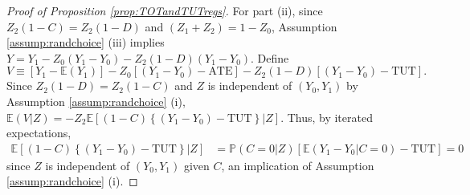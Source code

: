\begin{appendix}
\begin{proof}[Proof of Proposition \ref{prop:TOTandTUTregs}]
For part (ii), since $Z_2(1 - C)= Z_2(1 - D)$ and $(Z_1 + Z_2) = 1 - Z_0$,  Assumption \ref{assump:randchoice} (iii) implies $Y= Y_1 - Z_0 (Y_1 - Y_0) - Z_2(1 - D) (Y_1 - Y_0)$.
Define 
\[
V \equiv [Y_1 - \mathbb{E}(Y_1)] - Z_0[(Y_1 - Y_0) - \text{ATE}] - Z_2(1 - D)[(Y_1 - Y_0) - \text{TUT}].
\]
Since $Z_2(1 - D) = Z_2 (1 - C)$ and $Z$ is independent of $(Y_0, Y_1)$ by Assumption \ref{assump:randchoice} (i),
$\mathbb{E}(V|Z) = -Z_2\mathbb{E}[(1 - C)\left\{(Y_1 - Y_0) - \text{TUT}\right\}|Z]$.
Thus, by iterated expectations,
\begin{align*}
\mathbb{E}[(1 - C)\left\{(Y_1 - Y_0) - \text{TUT}\right\}|Z]
&= \mathbb{P}(C=0|Z) \left[ \mathbb{E}(Y_1 - Y_0|C=0) - \text{TUT}\right] = 0
\end{align*}
since $Z$ is independent of $(Y_0, Y_1)$ given $C$, an implication of Assumption \ref{assump:randchoice} (i).
\end{proof}


\end{appendix}
